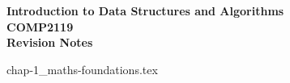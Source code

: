 \documentclass[noamsfonts,notitlepage,a4paper,openany]{amsbook}
\begin{document}
\begin{center}
    \LARGE\textbf{\color{hkublack}Introduction to Data Structures and Algorithms} \\
    \large\textbf{COMP2119} \\
    \textbf{Revision Notes}
\end{center}

\frontmatter{}
\tableofcontents

\mainmatter{}\newpage
{chap-1_maths-foundations.tex}
\end{document}

